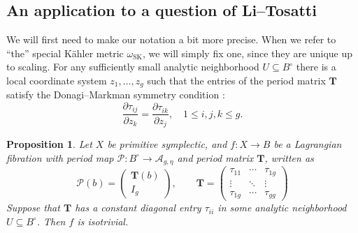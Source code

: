 \documentclass[12pt]{amsart}
\newcommand{\cP}{\mathcal{P}}
\newcommand{\cA}{\mathcal{A}}
\newtheorem{proposition}[theorem]{Proposition}
\theoremstyle{definition}
\numberwithin{equation}{section}
\begin{document}
\subsection{An application to a question of Li--Tosatti} 

We will first need to make our notation a bit more precise. When we refer to 
``the'' special K\"ahler metric \(\omega_\mathrm{SK}\), we will simply fix one, 
since they are unique up to scaling. For any sufficiently small analytic neighborhood 
\(U \subseteq B^\circ\) there is a local coordinate system \(z_1, \dots, z_g\) 
such that the entries of the period matrix \(\mathbf{T}\) satisfy the 
Donagi--Markman symmetry condition \cite{donagi-markman94}:
\begin{equation} \label{eq-donagi-markman}
    \frac{\partial \tau_{ij}}{\partial z_k} = \frac{\partial \tau_{ik}}{\partial z_j}, 
    \quad 1 \leq i, j, k \leq g.
\end{equation}


\begin{proposition} \label{constant-diagonal-entry}
    Let \(X\) be primitive symplectic, and \(f: X \to B\) be a Lagrangian fibration 
    with period map \(\cP: B^\circ \to \cA_{g, \eta}\) and period matrix \(\mathbf{T}\), written as
    \begin{equation*}
        \cP(b) = \begin{pmatrix}
            \mathbf{T}(b) \\ I_g
        \end{pmatrix},\qquad \mathbf{T} = \begin{pmatrix}
            \tau_{11} & \cdots & \tau_{1g} \\ 
            \vdots & \ddots & \vdots \\ 
            \tau_{1g} & \cdots & \tau_{gg}
        \end{pmatrix}
    \end{equation*}
    Suppose that \(\mathbf{T}\) has a constant diagonal entry \(\tau_{ii}\)
    in some analytic neighborhood \(U \subseteq B^\circ\). Then \(f\) is isotrivial.
\end{proposition}
\end{document}

